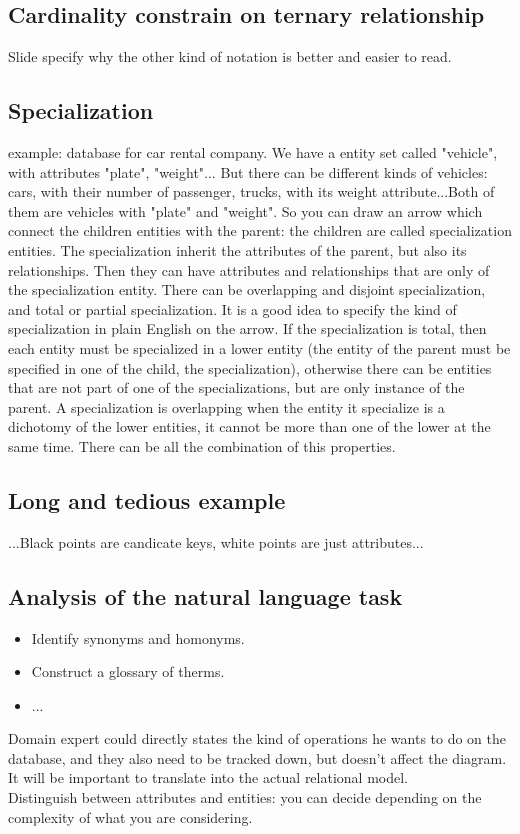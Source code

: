 \documentclass[11pt]{report}
\theoremstyle{definition}
\theoremstyle{remark}
\begin{document}
\subsection*{Cardinality constrain on ternary relationship}
Slide specify why the other kind of notation is better and easier to read. 
\subsection*{Specialization}
example: database for car rental company. We have a entity set called "vehicle", with attributes "plate", "weight"... But there can be different kinds of vehicles: cars, with their number of passenger, trucks, with its weight attribute...Both of them are vehicles with "plate" and "weight". So you can draw an arrow which connect the children entities with the parent: the children are called specialization entities. The specialization inherit the attributes of the parent, but also its relationships. Then they can have attributes and relationships that are only of the specialization entity. 
There can be overlapping and disjoint specialization, and total or partial specialization. It is a good idea to specify the kind of specialization in plain English on the arrow. If the specialization is total, then each entity must be specialized in a lower entity (the entity of the parent must be specified in one of the child, the specialization), otherwise there can be entities that are not part of one of the specializations, but are only instance of the parent. A specialization is overlapping when the entity it specialize is a dichotomy of the lower entities, it cannot be more than one of the lower at the same time. There can be all the combination of this properties. 
\subsection*{Long and tedious example}
...Black points are candicate keys, white points are just attributes...
\subsection*{Analysis of the natural language task}
\begin{itemize}
    \item Identify synonyms and homonyms.
    \item Construct a glossary of therms.
    \item ...
\end{itemize}
Domain expert could directly states the kind of operations he wants to do on the database, and they also need to be tracked down, but doesn't affect the diagram. It will be important to translate into the actual relational model.\\
Distinguish between attributes and entities: you can decide depending on the complexity of what you are considering.
\end{document}
